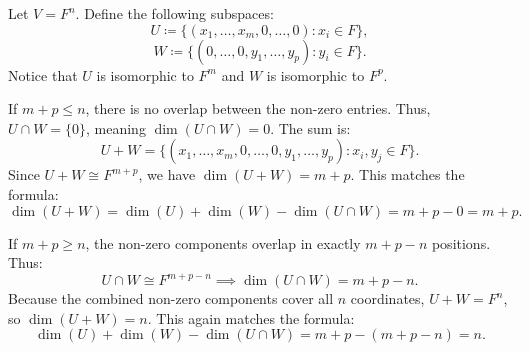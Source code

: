 \documentclass[../linear_algebra_and_groups.tex]{subfiles}
\begin{document}
\begin{example}
    Let $V=F^n$. Define the following subspaces:
    \[ U \coloneqq \{(x_1,\dots,x_m,0,\dots,0) : x_i\in F\}, \]
    \[ W \coloneqq \{(0,\dots,0,y_1,\dots,y_p) : y_i\in F\}. \]
    Notice that $U$ is isomorphic to $F^m$ and $W$ is isomorphic to $F^p$. 
    
    If $m+p \le n$, there is no overlap between the non-zero entries. Thus, $U\cap W=\{0\}$, meaning $\dim(U\cap W)=0$. The sum is:
    \[ U+W = \{(x_1,\dots,x_m,0,\dots,0,y_1,\dots,y_p) : x_i,y_j\in F\}. \]
    Since $U+W \cong F^{m+p}$, we have $\dim(U+W)=m+p$. This matches the formula:
    \[ \dim(U+W) = \dim(U) + \dim(W) - \dim(U\cap W) = m + p - 0 = m+p. \]

    If $m+p \ge n$, the non-zero components overlap in exactly $m+p-n$ positions. Thus:
    \[ U\cap W \cong F^{m+p-n} \implies \dim(U\cap W) = m+p-n. \]
    Because the combined non-zero components cover all $n$ coordinates, $U+W = F^n$, so $\dim(U+W) = n$. This again matches the formula:
    \[ \dim(U) + \dim(W) - \dim(U\cap W) = m + p - (m+p-n) = n. \]
\end{example}
\end{document}
